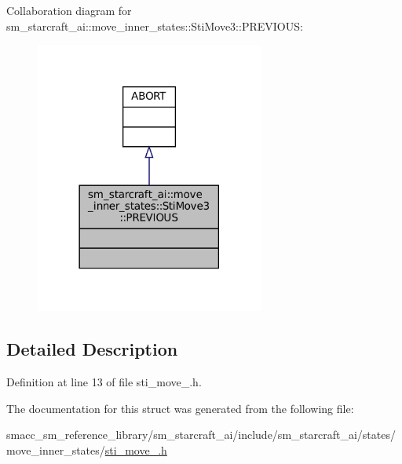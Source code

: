 Collaboration diagram for sm\+\_\+starcraft\+\_\+ai\+:\+:move\+\_\+inner\+\_\+states\+:\+:Sti\+Move3\+:\+:P\+R\+E\+V\+I\+O\+US\+:
\nopagebreak
\begin{figure}[H]
\begin{center}
\leavevmode
\includegraphics[width=213pt]{structsm__starcraft__ai_1_1move__inner__states_1_1StiMove3_1_1PREVIOUS__coll__graph}
\end{center}
\end{figure}


\subsection{Detailed Description}


Definition at line 13 of file sti\+\_\+move\+\_.\+h.



The documentation for this struct was generated from the following file\+:\begin{DoxyCompactItemize}
\item 
smacc\+\_\+sm\+\_\+reference\+\_\+library/sm\+\_\+starcraft\+\_\+ai/include/sm\+\_\+starcraft\+\_\+ai/states/move\+\_\+inner\+\_\+states/\hyperlink{sti__move__3_8h}{sti\+\_\+move\+\_.\+h}\end{DoxyCompactItemize}
